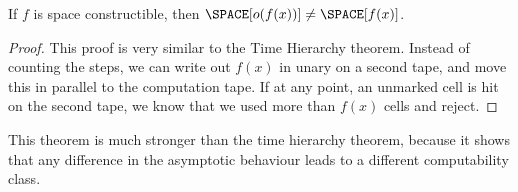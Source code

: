\begin{theorem}
	If $f$ is space constructible, then $\SPACE[o(f(x))] \neq \SPACE[f(x)]$.
\end{theorem}
\begin{proof}
	This proof is very similar to the Time Hierarchy theorem. Instead of 
	counting the steps, we can write out $f(x)$ in unary on a second tape, and 
	move this in parallel to the computation tape. If at any point, an unmarked 
	cell is hit on the second tape, we know that we used more than $f(x)$ cells 
	and reject.
\end{proof}
This theorem is much stronger than the time hierarchy theorem, because it 
shows that any difference in the asymptotic behaviour leads to a different 
computability class.


